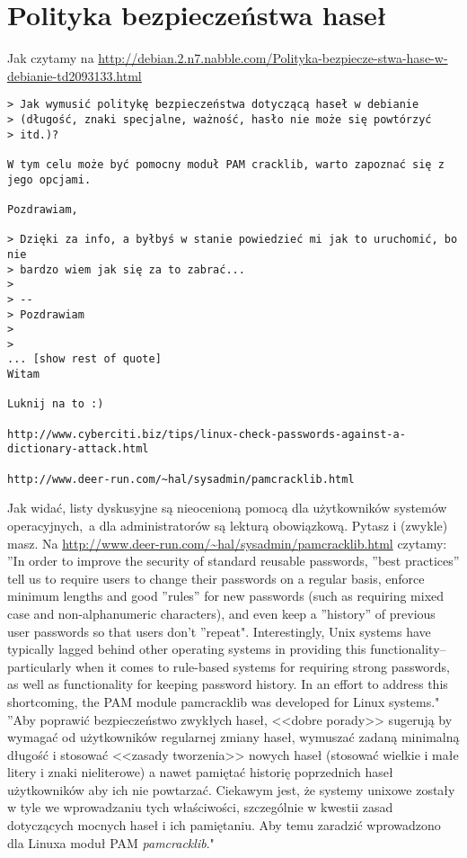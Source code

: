 \documentclass[a4paper,titlepage,12pt]{mwart}
\begin{document}
\section{Polityka bezpieczeństwa haseł}
Jak czytamy na \url{http://debian.2.n7.nabble.com/Polityka-bezpiecze-stwa-hase-w-debianie-td2093133.html}
\begin{verbatim}
> Jak wymusić politykę bezpieczeństwa dotyczącą haseł w debianie
> (długość, znaki specjalne, ważność, hasło nie może się powtórzyć
> itd.)?

W tym celu może być pomocny moduł PAM cracklib, warto zapoznać się z
jego opcjami.

Pozdrawiam, 

> Dzięki za info, a byłbyś w stanie powiedzieć mi jak to uruchomić, bo nie
> bardzo wiem jak się za to zabrać...
>
> --
> Pozdrawiam
>
> 
... [show rest of quote]
Witam

Luknij na to :)

http://www.cyberciti.biz/tips/linux-check-passwords-against-a-dictionary-attack.html

http://www.deer-run.com/~hal/sysadmin/pamcracklib.html
\end{verbatim}
Jak widać, listy dyskusyjne są nieocenioną pomocą dla użytkowników systemów operacyjnych,~a dla administratorów są lekturą obowiązkową. Pytasz i (zwykle) masz.\newline
Na \url{http://www.deer-run.com/~hal/sysadmin/pamcracklib.html} czytamy: ''In order to improve the security of standard reusable passwords, ''best practices'' tell us to require users to change their passwords on a regular basis, enforce minimum lengths and good ''rules'' for new passwords (such as requiring mixed case and non-alphanumeric characters), and even keep a ''history'' of previous user passwords so that users don't ''repeat". Interestingly, Unix systems have typically lagged behind other operating systems in providing this functionality--particularly when it comes to rule-based systems for requiring strong passwords, as well as functionality for keeping password history. In an effort to address this shortcoming, the PAM module pamcracklib was developed for Linux systems."\newline
''Aby poprawić bezpieczeństwo zwykłych haseł, <<dobre porady>> sugerują by wymagać od użytkowników regularnej zmiany haseł, wymuszać zadaną minimalną długość i stosować <<zasady tworzenia>> nowych haseł (stosować wielkie i małe litery i znaki nieliterowe) a nawet pamiętać historię poprzednich haseł użytkowników aby ich nie powtarzać. Ciekawym jest, że systemy unixowe zostały w tyle we wprowadzaniu tych właściwości, szczególnie w kwestii zasad dotyczących mocnych haseł i ich pamiętaniu. Aby temu zaradzić wprowadzono dla Linuxa moduł PAM \textit{pamcracklib}."
\end{document}
